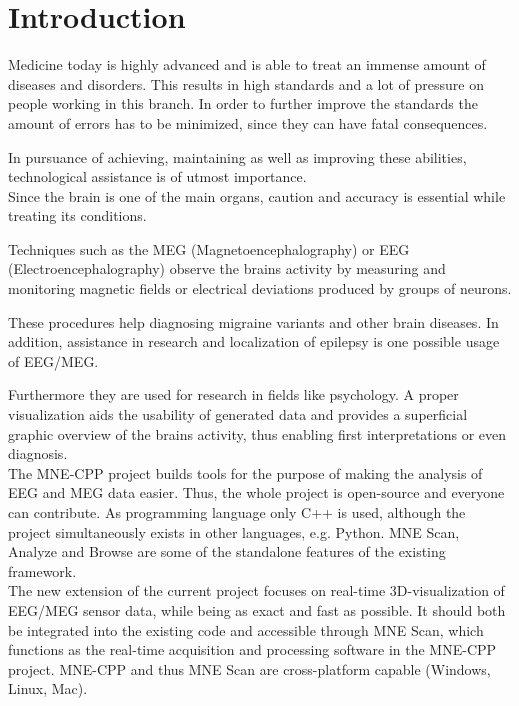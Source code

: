 
\section{Introduction}

	Medicine today is highly advanced and is able to treat an immense amount of diseases and disorders.
	This results in high standards and a lot of pressure on people working in this branch. In order to further improve the 			standards the amount of errors has to be minimized, since they can have fatal consequences. %

	In pursuance of achieving, maintaining as well as improving these abilities, technological assistance is of utmost 				importance.\\  

	Since the brain is one of the main organs, caution and accuracy is essential while treating its conditions. 
	
	Techniques such as the MEG (Magnetoencephalography) or EEG (Electroencephalography) observe the brains activity by 				measuring and monitoring magnetic fields or electrical deviations produced by groups of neurons.

	These procedures help diagnosing migraine variants and other brain diseases. In addition, assistance in 				research and localization of epilepsy is one possible usage of EEG/MEG. 
	 
	Furthermore they are used for research in fields like psychology.
	A proper visualization aids the usability of generated data and provides a superficial graphic overview of the brains 			activity, thus enabling first interpretations or even diagnosis.\\
	

	The MNE-CPP  project builds tools for the purpose of making the analysis of EEG and MEG data easier.
	Thus, the whole project is open-source and everyone can contribute. As programming language only C++ is used, although the 	project simultaneously exists in other languages, e.g. Python. 
	MNE Scan, Analyze and Browse are some of the standalone features of the existing framework. \\

	The new extension of the current project focuses on real-time 3D-visualization of EEG/MEG sensor data, while being as 			exact and fast as possible. It should both be integrated into the existing code and accessible through MNE Scan, which 			functions as the real-time acquisition and processing software in the MNE-CPP project. MNE-CPP and thus MNE Scan are 			cross-platform capable (Windows, Linux, Mac). 
  
